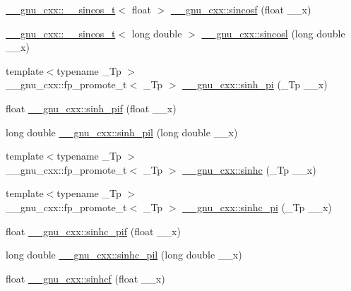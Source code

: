 \begin{DoxyCompactItemize}
\hyperlink{struct____gnu__cxx_1_1____sincos__t}{\+\_\+\+\_\+gnu\+\_\+cxx\+::\+\_\+\+\_\+sincos\+\_\+t}$<$ float $>$ \hyperlink{group__gnu__math__spec__func_ga3929d13e38535418cd24db5cee80660c}{\+\_\+\+\_\+gnu\+\_\+cxx\+::sincosf} (float \+\_\+\+\_\+x)
\item 
\hyperlink{struct____gnu__cxx_1_1____sincos__t}{\+\_\+\+\_\+gnu\+\_\+cxx\+::\+\_\+\+\_\+sincos\+\_\+t}$<$ long double $>$ \hyperlink{group__gnu__math__spec__func_ga96a7222e47d430a228973658ca9f6f35}{\+\_\+\+\_\+gnu\+\_\+cxx\+::sincosl} (long double \+\_\+\+\_\+x)
\item 
{\footnotesize template$<$typename \+\_\+\+Tp $>$ }\\\+\_\+\+\_\+gnu\+\_\+cxx\+::fp\+\_\+promote\+\_\+t$<$ \+\_\+\+Tp $>$ \hyperlink{group__gnu__math__spec__func_gade43453b87b6b38c05b3fcce40870542}{\+\_\+\+\_\+gnu\+\_\+cxx\+::sinh\+\_\+pi} (\+\_\+\+Tp \+\_\+\+\_\+x)
\item 
float \hyperlink{group__gnu__math__spec__func_ga74103f57ab0d97126732f3cb276c5ab3}{\+\_\+\+\_\+gnu\+\_\+cxx\+::sinh\+\_\+pif} (float \+\_\+\+\_\+x)
\item 
long double \hyperlink{group__gnu__math__spec__func_ga2232ee554ef2a902824db42e2e09c483}{\+\_\+\+\_\+gnu\+\_\+cxx\+::sinh\+\_\+pil} (long double \+\_\+\+\_\+x)
\item 
{\footnotesize template$<$typename \+\_\+\+Tp $>$ }\\\+\_\+\+\_\+gnu\+\_\+cxx\+::fp\+\_\+promote\+\_\+t$<$ \+\_\+\+Tp $>$ \hyperlink{group__gnu__math__spec__func_gaf2f02e4143e7beb97352cef4b7fcb663}{\+\_\+\+\_\+gnu\+\_\+cxx\+::sinhc} (\+\_\+\+Tp \+\_\+\+\_\+x)
\item 
{\footnotesize template$<$typename \+\_\+\+Tp $>$ }\\\+\_\+\+\_\+gnu\+\_\+cxx\+::fp\+\_\+promote\+\_\+t$<$ \+\_\+\+Tp $>$ \hyperlink{group__gnu__math__spec__func_ga8bb6034e28d48879845bf64818cc06e1}{\+\_\+\+\_\+gnu\+\_\+cxx\+::sinhc\+\_\+pi} (\+\_\+\+Tp \+\_\+\+\_\+x)
\item 
float \hyperlink{group__gnu__math__spec__func_ga26e54504db6541550266140f5264acbe}{\+\_\+\+\_\+gnu\+\_\+cxx\+::sinhc\+\_\+pif} (float \+\_\+\+\_\+x)
\item 
long double \hyperlink{group__gnu__math__spec__func_gaa572bf7633f457c86cef65bfd6ec4ad9}{\+\_\+\+\_\+gnu\+\_\+cxx\+::sinhc\+\_\+pil} (long double \+\_\+\+\_\+x)
\item 
float \hyperlink{group__gnu__math__spec__func_gadaa7ea78625cc2eeb70213a50719813d}{\+\_\+\+\_\+gnu\+\_\+cxx\+::sinhcf} (float \+\_\+\+\_\+x)

\end{DoxyCompactItemize}
